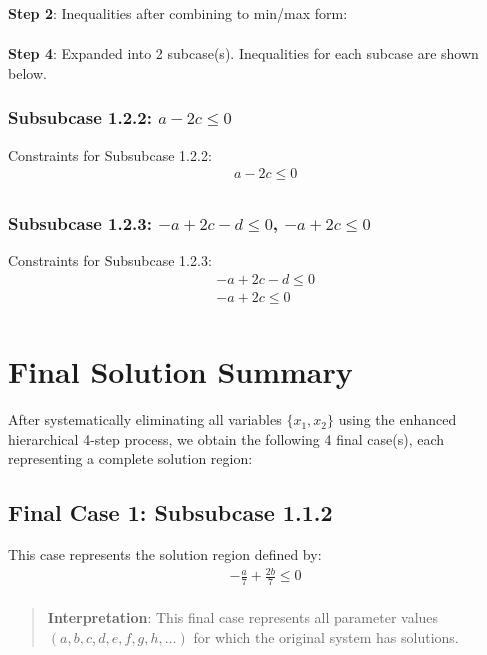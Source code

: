 \documentclass{article}
\newenvironment{stepdetail}
  {\begin{quote}\small\color{blue}}
  {\end{quote}}
\begin{document}
\textbf{Step 2}: Inequalities after combining to min/max form:
\begin{align}
\end{align}

\textbf{Step 4}: Expanded into 2 subcase(s). Inequalities for each subcase are shown below.

\subsubsection{Subsubcase 1.2.2: $a - 2 c \leq 0$}

Constraints for Subsubcase 1.2.2:
\begin{align}
& a - 2 c \leq 0 \\
\end{align}

\subsubsection{Subsubcase 1.2.3: $- a + 2 c - d \leq 0$, $- a + 2 c \leq 0$}

Constraints for Subsubcase 1.2.3:
\begin{align}
& - a + 2 c - d \leq 0 \\
& - a + 2 c \leq 0 \\
\end{align}

\section{Final Solution Summary}

After systematically eliminating all variables $\{x_{1}, x_{2}\}$
using the enhanced hierarchical 4-step process, we obtain the following
4 final case(s), each representing a complete solution region:

\subsection{Final Case 1: Subsubcase 1.1.2}

This case represents the solution region defined by:
\begin{align}
& - \frac{a}{7} + \frac{2 b}{7} \leq 0 \\
\end{align}

\begin{stepdetail}
\textbf{Interpretation}: This final case represents all parameter values
$(a, b, c, d, e, f, g, h, \ldots)$ for which the original system has solutions.
\end{stepdetail}
\end{document}
